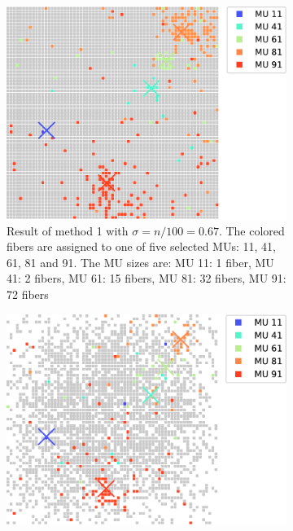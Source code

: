 \begin{figure}
\begin{subfigure}[t]{0.48\textwidth}
  \end{subfigure}
  \begin{subfigure}[t]{0.48\textwidth}%
    \centering%
    \includegraphics[width=\textwidth]{images/motor_unit_assignment/MU_fibre_distribution_67x67_100_some_2d_fiber_distribution.pdf}%
    \caption{Result of method 1 with $\sigma = n/100 = \num{0.67}$. The colored fibers are assigned to one of five selected MUs: 11, 41, 61, 81 and 91. The MU sizes are: 
    MU 11: 1 fiber,
    MU 41: 2 fibers,
    MU 61: 15 fibers,
    MU 81: 32 fibers,
    MU 91: 72 fibers}%
    \label{fig:MU_fibre_distribution_67x67_100_some_2d_fiber_distribution.pdf}%
  \end{subfigure}
  \quad
  \begin{subfigure}[t]{0.48\textwidth}%
    \centering%
    \includegraphics[width=\textwidth]{images/motor_unit_assignment/MU_fibre_distribution_sparse2_67x67_100_2d_fiber_distribution.pdf}%

\end{subfigure}
\end{figure}
